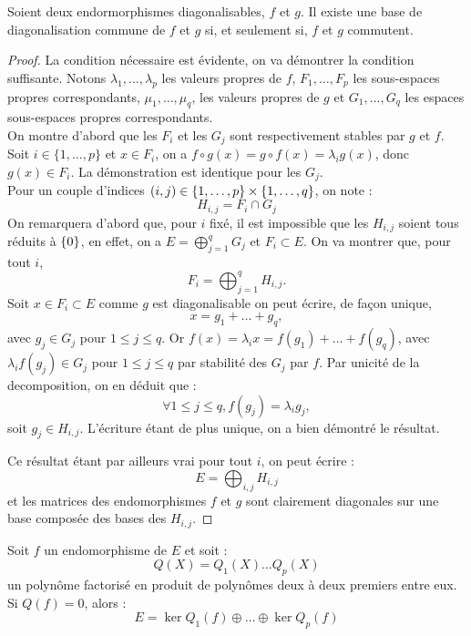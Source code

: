 \documentclass{article}
\begin{document}
\begin{thm}
Soient deux endormorphismes diagonalisables, $f$ et $g$. Il existe une base de diagonalisation commune de $f$ et $g$ si,
et seulement si, $f$ et $g$ commutent.
\end{thm}

\begin{proof}
La condition nécessaire est évidente, on va démontrer la condition suffisante.
Notons $\lambda_1, \dots, \lambda_p$ les valeurs propres de $f$, 
$F_1, \dots, F_p$ les sous-espaces propres correspondants,
$\mu_1, \dots, \mu_q$, les valeurs propres de $g$ et 
$G_1, \dots, G_q$ les espaces sous-espaces propres correspondants.\\
On montre d'abord que les $F_i$ et les $G_j$ sont respectivement stables par $g$ et $f$. \\
Soit $i \in \{1, \dots, p \}$ et $x \in F_i$, on a $f \circ g (x) = g \circ f (x) = \lambda_i g(x)$, donc $g(x) \in F_i$. 
La démonstration est identique pour les $G_j$. \\
Pour un couple d'indices $(i,j) \in \{ 1,\dots,p \} \times \{ 1, \dots, q \}$, on note :
\[ H_{i,j} = F_i \cap G_j \]
On remarquera d'abord que, pour $i$ fixé, il est impossible que les $H_{i,j}$ soient tous réduits à $\{ 0 \}$,
en effet, on a $E = \bigoplus_{j=1}^q G_j$ et $F_i \subset E$. 
On va montrer que, pour tout $i$, 
\[ F_i = \bigoplus_{j=1}^q H_{i,j} . \]
Soit $x \in F_i \subset E$ comme $g$ est diagonalisable on peut écrire, de façon unique,
\[ x = g_1 + \dots + g_q, \]
avec $g_j \in G_j$ pour $1 \leq j \leq q$. Or $f(x) = \lambda_i x = f(g_1) + \dots + f(g_q)$, 
avec $\lambda_i f(g_j) \in G_j$ pour $1 \leq j \leq q$ par stabilité des $G_j$ par $f$.
Par unicité de la decomposition, on en déduit que :
\[ \forall 1 \leq j \leq q, f(g_j) = \lambda_i g_j, \] 
soit $g_j \in H_{i,j}$. L'écriture étant de plus unique, on a bien démontré le résultat. \newline

Ce résultat étant par ailleurs vrai pour tout $i$, on peut écrire :
\[ E =  \bigoplus_{i, j} H_{i,j} \]
et les matrices des endomorphismes $f$ et $g$ sont clairement diagonales sur une base composée des bases des $H_{i,j}$.
\end{proof}

\begin{lem}
Soit $f$ un endomorphisme de $E$ et soit :
\[ Q(X) = Q_1(X) \dots Q_p(X) \]
un polynôme factorisé en produit de polynômes deux à deux premiers entre eux. \\
Si $Q(f) = 0$, alors :
\[ E = \ker{Q_1(f)} \oplus \dots \oplus \ker{Q_p(f)} \]
\end{lem}
\end{document}

